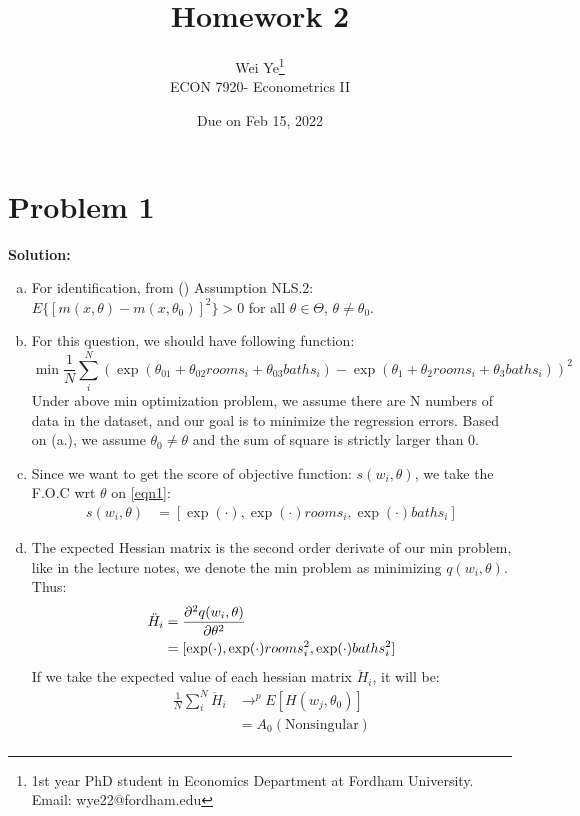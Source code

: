 \documentclass[11pt]{article} %
\title{Homework 2}
\author{Wei Ye\footnote{ 1st year PhD student in Economics Department at Fordham University. Email: wye22@fordham.edu}
    \\ ECON 7920- Econometrics II}
\date{Due on Feb 15, 2022}
\begin{document}
\maketitle

\section{Problem 1}
\textbf{Solution:}

\begin{enumerate}[a.]
    \item For identification, from (\citet{wooldridge2010econometric}) Assumption NLS.2: $E\{[m(x,\theta)-m(x,\theta_0)]^2\}>0$ for all $\theta \in \Theta$, $\theta \neq \theta_0$. 
    \item For this question, we should have following function:
        \begin{equation}\label{eqn1}
            \min \frac{1}{N} \sum_i^N (\exp(\theta_{01}+\theta_{02}rooms_i+\theta_{03}baths_i)-\exp(\theta_1+\theta_2rooms_i+\theta_3baths_i))^2
        \end{equation}
    Under above min optimization problem, we assume there are N numbers of data in the dataset, and our goal is to minimize the regression errors. Based on (a.), we assume $\theta_0\neq \theta$ and the sum of square is strictly larger than 0. 
    \item Since we want to get the score of objective function: $s(w_i,\theta)$, we take the F.O.C wrt $\theta$ on \ref{eqn1}:
        \begin{align}
             s(w_i,\theta)&= [\exp(\cdot),\exp(\cdot)rooms_i,\exp(\cdot)baths_i]
        \end{align}
    \item The expected Hessian matrix is the second order derivate of our min problem, like in the lecture notes, we denote the min problem as minimizing $q(w_i,\theta)$. Thus:
        \begin{align}
            \ddot{H}_i&= \frac{\partial^2 q(w_i,\theta)}{\partial \theta^2}\\\notag
            &= [\exp(\cdot),\exp(\cdot)rooms_i^2,\exp(\cdot)baths_i^2]
        \end{align}
        If we take the expected value of each hessian matrix $\ddot{H}_i$, it will be:
        \begin{align*}
            \frac{1}{N}\sum_i^N \ddot{H}_i&\rightarrow^p E[H(w_j,\theta_0)]\\
                                         &= A_0 (\text{Nonsingular})\\

\end{align*}
\end{enumerate}
\end{document}
